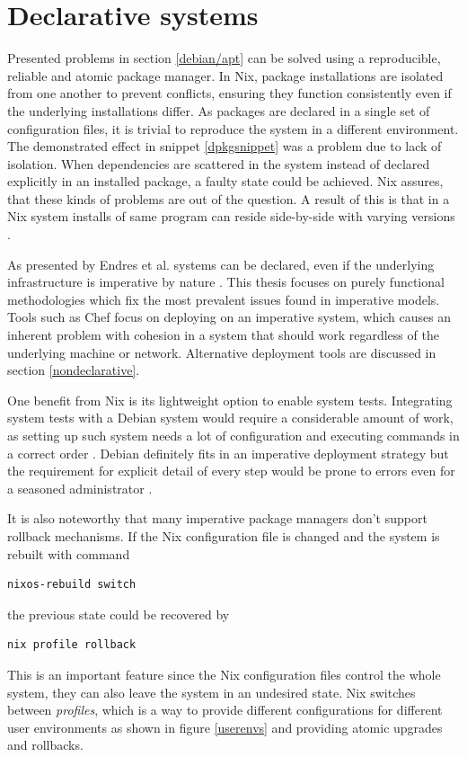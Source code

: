 \section{Declarative systems} \label{declarativesystems}

Presented problems in section \ref{debian/apt} can be solved using a
reproducible, reliable and atomic package manager. In Nix, package
installations are isolated from one another to prevent conflicts,
ensuring they function consistently even if the underlying
installations differ. As packages are declared in a single set of
configuration files, it is trivial to reproduce the system in a
different environment. The demonstrated effect in snippet
\ref{dpkgsnippet} was a problem due to lack of isolation. When
dependencies are scattered in the system instead of declared
explicitly in an installed package, a faulty state could be
achieved. Nix assures, that these kinds of problems are out of the
question. A result of this is that in a Nix system installs of same
program can reside side-by-side with varying versions
\cite{dolstra2008nixos}.

As presented by Endres et al. systems can be declared, even if the
underlying infrastructure is imperative by nature
\cite{endres2017declarative}. This thesis focuses on purely functional
methodologies which fix the most prevalent issues found in
imperative models. Tools such as Chef focus on deploying on an
imperative system, which causes an inherent problem with cohesion in a
system that should work regardless of the underlying machine or
network. Alternative deployment tools are discussed in section
\ref{nondeclarative}.

One benefit from Nix is its lightweight option to enable system
tests. Integrating system tests with a Debian system would require a
considerable amount of work, as setting up such system needs a lot of
configuration and executing commands in a correct order
\cite{van2010automating}. Debian definitely fits in an imperative
deployment strategy but the requirement for explicit detail of every
step would be prone to errors even for a seasoned administrator
\cite{breitenbucher2017declarative}.

It is also noteworthy that many imperative package managers don't
support rollback mechanisms. If the Nix configuration file is changed
and the system is rebuilt with command
\begin{lstlisting}
nixos-rebuild switch
\end{lstlisting}
the previous state could be recovered by
\begin{lstlisting}
nix profile rollback
\end{lstlisting}
This is an important feature since the Nix configuration files control
the whole system, they can also leave the system in an undesired
state. Nix switches between \textit{profiles}, which is a way to
provide different configurations for different user environments as
shown in figure \ref{userenvs} and providing atomic upgrades and
rollbacks. \cite{nixosNixOSManual}

